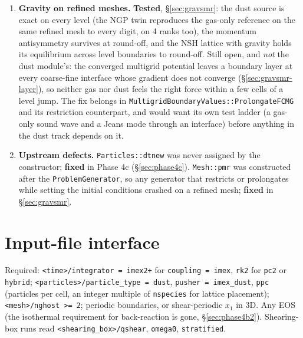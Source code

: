 \documentclass[11pt]{article}
\newcommand{\code}[1]{\texttt{#1}}
\newcommand{\fn}[1]{\texttt{\small #1}}
\begin{document}
\begin{enumerate}
      remesh, across ranks, the dust state is rebuilt, a criterion on the dust density
      drives the refinement, and particles are split on refinement (the answer to the
      linA diagnosis of the validation document, \S10.5: a coarse-sampled population
      entering a finer level keeps its coarse sampling), with any number of levels
      (\S\ref{sec:phase6-levels}). Still open: the coupled drag solvers under
      refinement, merging on derefinement, and a load balance that counts particles (the
      cost estimate is one per MeshBlock). \code{<mesh\_refinement>/prolong\_limiter = none} (unlimited
      central slopes in \fn{ProlongCC}) is available as a diagnostic.
\item \textbf{Gravity on refined meshes.} \textbf{Tested},
      \S\ref{sec:gravsmr}: the dust source is exact on every level (the NGP twin
      reproduces the gas-only reference on the same refined mesh to every digit, on 4
      ranks too), the momentum antisymmetry survives at round-off, and the NSH lattice
      with gravity holds its equilibrium across level boundaries to round-off. Still
      open, and \emph{not} the dust module's: the converged multigrid potential leaves a
      boundary layer at every coarse-fine interface whose gradient does not converge
      (\S\ref{sec:gravsmr-layer}), so neither gas nor dust feels the right force within
      a few cells of a level jump. The fix belongs in
      \fn{MultigridBoundaryValues::ProlongateFCMG} and its restriction counterpart, and
      would want its own test ladder (a gas-only sound wave and a Jeans mode through an
      interface) before anything in the dust track depends on it.
\item \textbf{Upstream defects.} \code{Particles::dtnew} was never assigned by the
      constructor; \textbf{fixed} in Phase 4c (\S\ref{sec:phase4c}).
      \code{Mesh::pmr} was constructed after the \code{ProblemGenerator}, so any
      generator that restricts or prolongates while setting the initial conditions
      crashed on a refined mesh; \textbf{fixed} in \S\ref{sec:gravsmr}.
\end{enumerate}

\section{Input-file interface}
\label{sec:params}

Required: \code{<time>/integrator = imex2+} for \code{coupling = imex}, \code{rk2}
for \code{pc2} or \code{hybrid}; \code{<particles>/particle\_type = dust},
\code{pusher = imex\_dust}, \code{ppc} (particles per cell, an integer multiple of
\code{nspecies} for lattice placement); \code{<mesh>/nghost >= 2}; periodic
boundaries, or shear-periodic $x_1$ in 3D. Any EOS (the isothermal requirement for back-reaction is gone, \S\ref{sec:phase4b2}). Shearing-box runs read \code{<shearing\_box>/qshear},
\code{omega0}, \code{stratified}.
\end{document}
